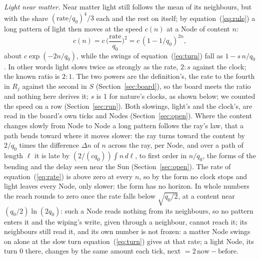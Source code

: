 \documentclass[pdflatex,sn-mathphys-num]{sn-jnl}
\begin{document}
\textit{Light near matter.} Near matter light still follows the mean of its neighbours, but with the share $(\mathrm{rate}/q_0)^4/3$ each and the rest on itself; by equation~(\ref{eq:rule}) a long pattern of light then moves at the speed $c(n)$ at a Node of content $n$:
\begin{equation}\label{eq:light}
c(n) = c\,\Big(\frac{\mathrm{rate}}{q_0}\Big)^{2} = c\,(1 - 1/q_0)^{2n},
\end{equation}
about $c\exp(-2n/q_0)$, while the swings of equation~(\ref{eq:turn}) fall as $1 - s\,n/q_0$. In other words light slows twice as strongly as the rate, $2 : s$ against the clock; the known ratio is $2 : 1$. The two powers are the definition's, the rate to the fourth in $R_j$ against the second in $S$ (Section~\ref{sec:board}), so the board meets the ratio and nothing here derives it; $s$ is 1 for nature's clocks, as shown below; we counted the speed on a row (Section~\ref{sec:run}). Both slowings, light's and the clock's, are read in the board's own ticks and Nodes (Section~\ref{sec:open}). Where the content changes slowly from Node to Node a long pattern follows the ray's law, that a path bends toward where it moves slower: the ray turns toward the content by $2/q_0$ times the difference $\Delta n$ of $n$ across the ray, per Node, and over a path of length $\ell$ it is late by $(2/(c q_0))\int n\,d\ell$, to first order in $n/q_0$, the forms of the bending and the delay seen near the Sun \cite{dyson1920,shapiro1964} (Section~\ref{sec:open}). The rate of equation~(\ref{eq:rate}) is above zero at every $n$, so by the form no clock stops and light leaves every Node, only slower: the form has no horizon. In whole numbers the reach rounds to zero once the rate falls below $\sqrt{q_0/2}$, at a content near $(q_0/2)\ln(2q_0)$: such a Node reads nothing from its neighbours, so no pattern enters it and the wiping's write, given through a neighbour, cannot reach it; its neighbours still read it, and its own number is not frozen: a matter Node swings on alone at the slow turn equation~(\ref{eq:turn}) gives at that rate; a light Node, its turn 0 there, changes by the same amount each tick, next $= 2\,\mathrm{now} - \mathrm{before}$.
\end{document}
